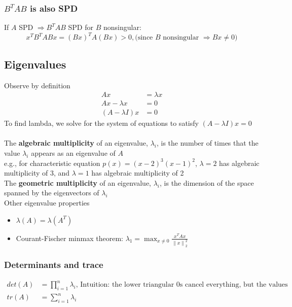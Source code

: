 \documentclass{article}
\newcommand{\norm}[2]{\left\lVert#1\right\rVert_#2}
\begin{document}
\subsubsection{$B^TAB$ is also SPD} 
If $A$ SPD $\Rightarrow B^TAB$ SPD for $B$ nonsingular:
\begin{equation*}
    x^TB^TABx = (Bx)^TA(Bx) > 0, \textrm{(since $B$ nonsingular $\Rightarrow Bx \neq 0$)}
\end{equation*}

\subsection{Eigenvalues}
Observe by definition
\begin{align*}
    Ax&= \lambda x\\
    Ax - \lambda x &= 0\\
    (A - \lambda I)x &= 0
\end{align*}
To find lambda, we solve for the system of equations to satisfy $(A - \lambda I)x = 0$\\ \\
The \textbf{algebraic multiplicity} of an eigenvalue, $\lambda_i$, is the number of times that the value $\lambda_i$ appears as an eigenvalue of $A$\\
e.g., for characteristic equation $p(x) = (x-2)^3(x-1)^2$, $\lambda = 2$ has algebraic multiplicity of 3, and $\lambda = 1$ has algebraic multiplicity of 2\\
The \textbf{geometric multiplicity} of an eigenvalue, $\lambda_i$, is the dimension of the space spanned by the eigenvectors of $\lambda_i$\\
Other eigenvalue properties
\begin{itemize}
    \item $\lambda(A) = \lambda(A^T)$
    \item Courant-Fischer minmax theorem: $\lambda_1 = \max_{x \neq 0}\frac{x^TAx}{\norm{x}{2}^2}$
\end{itemize}

\subsubsection{Determinants and trace}
\begin{align*}
    det(A) &= \prod_{i=1}^n \lambda_i \textrm{, Intuition: the lower triangular 0s cancel everything, but the values in the diagonal}\\
    tr(A) &= \sum_{i=1}^n \lambda_i \\
\end{align*}
\end{document}
